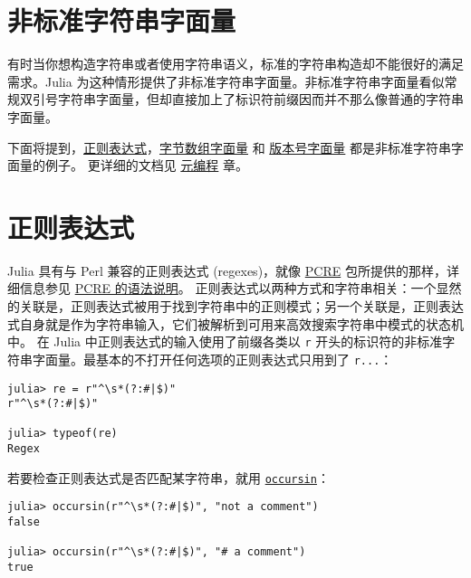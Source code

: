 \hypertarget{16709477590855265963}{}


\section{非标准字符串字面量}



有时当你想构造字符串或者使用字符串语义，标准的字符串构造却不能很好的满足需求。Julia 为这种情形提供了非标准字符串字面量。非标准字符串字面量看似常规双引号字符串字面量，但却直接加上了标识符前缀因而并不那么像普通的字符串字面量。



下面将提到，\hyperlink{17292082084708718801}{正则表达式}，\hyperlink{1529513445769909572}{字节数组字面量} 和 \hyperlink{12935585355849408291}{版本号字面量} 都是非标准字符串字面量的例子。 更详细的文档见 \hyperlink{6892717571106872427}{元编程} 章。



\hypertarget{1296431810594490609}{}


\section{正则表达式}



Julia 具有与 Perl 兼容的正则表达式 (regexes)，就像 \href{http://www.pcre.org/}{PCRE} 包所提供的那样，详细信息参见 \href{http://www.pcre.org/current/doc/html/pcre2syntax.html}{PCRE 的语法说明}。 正则表达式以两种方式和字符串相关：一个显然的关联是，正则表达式被用于找到字符串中的正则模式；另一个关联是，正则表达式自身就是作为字符串输入，它们被解析到可用来高效搜索字符串中模式的状态机中。 在 Julia 中正则表达式的输入使用了前缀各类以 \texttt{r} 开头的标识符的非标准字符串字面量。最基本的不打开任何选项的正则表达式只用到了 \texttt{r{\textquotedbl}...{\textquotedbl}}：




\begin{verbatim}
julia> re = r"^\s*(?:#|$)"
r"^\s*(?:#|$)"

julia> typeof(re)
Regex
\end{verbatim}



若要检查正则表达式是否匹配某字符串，就用 \hyperlink{7988132114328914630}{\texttt{occursin}}：




\begin{verbatim}
julia> occursin(r"^\s*(?:#|$)", "not a comment")
false

julia> occursin(r"^\s*(?:#|$)", "# a comment")
true
\end{verbatim}



